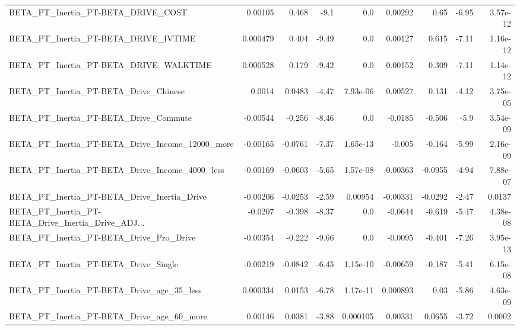 \begin{tabular}{lrrrrrrrr}
BETA\_PT\_Inertia\_PT-BETA\_DRIVE\_COST                 &     0.00105 &        0.468 &     -9.1 &      0.0 &    0.00292 &        0.65 &        -6.95 &      3.57e-12 \\
BETA\_PT\_Inertia\_PT-BETA\_DRIVE\_IVTIME               &    0.000479 &        0.404 &    -9.49 &      0.0 &    0.00127 &       0.615 &        -7.11 &      1.16e-12 \\
BETA\_PT\_Inertia\_PT-BETA\_DRIVE\_WALKTIME             &    0.000528 &        0.179 &    -9.42 &      0.0 &    0.00152 &       0.309 &        -7.11 &      1.14e-12 \\
BETA\_PT\_Inertia\_PT-BETA\_Drive\_Chinese              &      0.0014 &       0.0483 &    -4.47 & 7.93e-06 &    0.00527 &       0.131 &        -4.12 &      3.75e-05 \\
BETA\_PT\_Inertia\_PT-BETA\_Drive\_Commute              &    -0.00544 &       -0.256 &    -8.46 &      0.0 &    -0.0185 &      -0.506 &         -5.9 &      3.54e-09 \\
BETA\_PT\_Inertia\_PT-BETA\_Drive\_Income\_12000\_more    &    -0.00165 &      -0.0761 &    -7.37 & 1.65e-13 &     -0.005 &      -0.164 &        -5.99 &      2.16e-09 \\
BETA\_PT\_Inertia\_PT-BETA\_Drive\_Income\_4000\_less     &    -0.00169 &      -0.0603 &    -5.65 & 1.57e-08 &   -0.00363 &     -0.0955 &        -4.94 &      7.88e-07 \\
BETA\_PT\_Inertia\_PT-BETA\_Drive\_Inertia\_Drive        &    -0.00206 &      -0.0253 &    -2.59 &  0.00954 &   -0.00331 &     -0.0292 &        -2.47 &        0.0137 \\
BETA\_PT\_Inertia\_PT-BETA\_Drive\_Inertia\_Drive\_ADJ... &     -0.0207 &       -0.398 &    -8.37 &      0.0 &    -0.0644 &      -0.619 &        -5.47 &      4.38e-08 \\
BETA\_PT\_Inertia\_PT-BETA\_Drive\_Pro\_Drive            &    -0.00354 &       -0.222 &    -9.66 &      0.0 &    -0.0095 &      -0.401 &        -7.26 &      3.95e-13 \\
BETA\_PT\_Inertia\_PT-BETA\_Drive\_Single               &    -0.00219 &      -0.0842 &    -6.45 & 1.15e-10 &   -0.00659 &      -0.187 &        -5.41 &      6.15e-08 \\
BETA\_PT\_Inertia\_PT-BETA\_Drive\_age\_35\_less          &    0.000334 &       0.0153 &    -6.78 & 1.17e-11 &   0.000893 &        0.03 &        -5.86 &      4.63e-09 \\
BETA\_PT\_Inertia\_PT-BETA\_Drive\_age\_60\_more          &     0.00146 &       0.0381 &    -3.88 & 0.000105 &    0.00331 &      0.0655 &        -3.72 &        0.0002 \\

\end{tabular}
